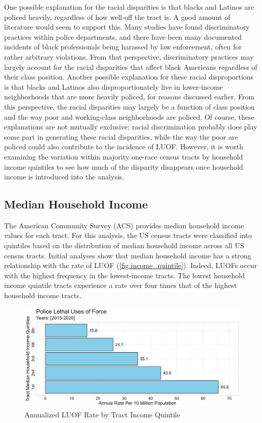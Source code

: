 \documentclass[12pt]{article}
\begin{document}
One possible explanation for the racial disparities is that blacks and Latinos are policed heavily, regardless of how well-off the tract is. A good amount of literature would seem to support this. Many studies have found discriminatory practices within police departments, and there have been many documented incidents of black professionals being harassed by law enforcement, often for rather arbitrary violations. From that perspective, discriminatory practices may largely account for the racial disparities that affect black Americans regardless of their class position. Another possible explanation for these racial disproportions is that blacks and Latinos also disproportionately live in lower-income neighborhoods that are more heavily policed, for reasons discussed earlier. From this perspective, the racial disparities may largely be a function of class position and the way poor and working-class neighborhoods are policed. Of course, these explanations are not mutually exclusive; racial discrimination probably does play some part in generating these racial disparities, while the way the poor are policed could also contribute to the incidence of LUOF. However, it is worth examining the variation within majority one-race census tracts by household income quintiles to see how much of the disparity disappears once household income is introduced into the analysis.

\subsection{Median Household Income}

The American Community Survey (ACS) provides median household income values for each tract. For this analysis, the US census tracts were classified into quintiles based on the distribution of median household income across all US census tracts. Initial analyses show that median household income has a strong relationship with the rate of LUOF (\autoref{fig:income_quintile}). Indeed, LUOFs occur with the highest frequency in the lowest-income tracts. The lowest household income quintile tracts experience a rate over four times that of the highest household income tracts.

\begin{figure}[H]
  \centering %
  \includegraphics[width=\linewidth]{images/income_quintiles_only_ind}
  \captionsetup{justification=centering, singlelinecheck=false, margin=2cm}
  \caption[Annualized LUOF Rate by Tract Income Quintile]{Annualized LUOF Rate by Tract Income Quintile}
  \label{fig:income_quintile}
\end{figure}
\end{document}
